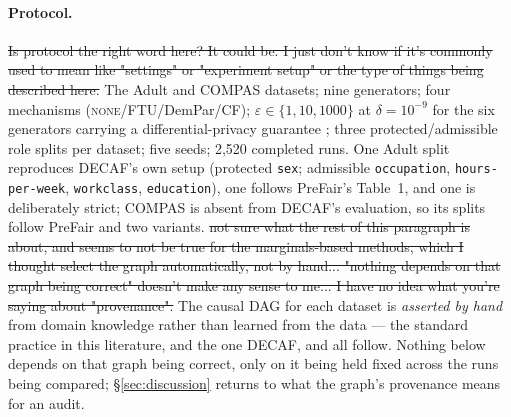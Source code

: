 \documentclass{article}
\begin{document}
\paragraph{Protocol.} \st{Is protocol the right word here? It could be. I just don't know if it's commonly used to mean like "settings" or "experiment setup" or the type of things being described here.}
The Adult \citep{becker1996adult} and COMPAS \citep{angwin2016machinebias}
datasets; nine
generators; four mechanisms (\textsc{none}/FTU/DemPar/CF); $\varepsilon \in
\{1,10,1000\}$ at $\delta = 10^{-9}$ for the six generators carrying a
differential-privacy guarantee \citep{dwork2006calibrating}; three
protected/admissible role splits per dataset; five seeds; 2{,}520 completed runs.
One Adult split reproduces DECAF's own setup (protected \texttt{sex}; admissible
\texttt{occupation}, \texttt{hours-per-week}, \texttt{workclass},
\texttt{education}), one follows PreFair's Table~1, and one is deliberately
strict; COMPAS is absent from DECAF's evaluation, so its splits follow PreFair and
two variants.  \st{not sure what the rest of this paragraph is about, and seems to not be true for the marginals-based methods, which I thought select the graph automatically, not by hand... "nothing depends on that graph being correct" doesn't make any sense to me... I have no idea what you're saying about "provenance".} The causal DAG for each dataset is \emph{asserted by hand} from
domain knowledge rather than learned from the data --- the standard practice in this
literature, and the one DECAF, \citet{kusner2017counterfactual} and
\citet{zhang2017causalframework} all follow. Nothing below depends on that graph
being correct, only on it being held fixed across the runs being compared;
\S\ref{sec:discussion} returns to what the graph's provenance means for an audit.
\end{document}

